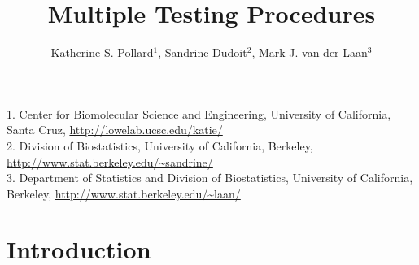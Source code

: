 \documentclass[11pt]{article}
\begin{document}
\title{Multiple Testing Procedures} 
\author{Katherine S. Pollard$^1$, Sandrine Dudoit$^2$, Mark J. van der Laan$^3$} 
\maketitle

\begin{center}
1. Center for Biomolecular Science and Engineering, University of California, Santa Cruz, \url{ http://lowelab.ucsc.edu/katie/}\\
2. Division of Biostatistics, University of California, Berkeley, \url{ http://www.stat.berkeley.edu/~sandrine/}\\
3. Department of Statistics and Division of Biostatistics, University of California, Berkeley, \url{ http://www.stat.berkeley.edu/~laan/}\\
\end{center}

\tableofcontents

\label{anal:mult:multtest}

\section{Introduction}
\label{anal:mult:s:intro}
\end{document}
